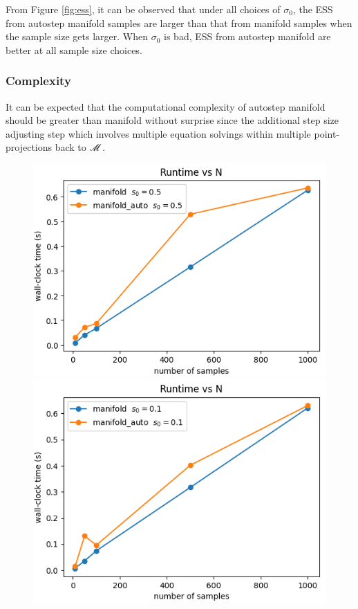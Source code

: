 \documentclass{article}
\begin{document}
From Figure \ref{fig:ess}, it can be observed that under all choices of $\sigma_0$, the ESS from autostep manifold samples are larger than that from manifold samples when the sample size gets larger. When $\sigma_0$ is bad, ESS from autostep manifold are better at all sample size choices.

\subsubsection{Complexity}
It can be expected that the computational complexity of autostep manifold should be greater than manifold without surprise since the additional step size adjusting step which involves multiple equation solvings within multiple point-projections back to $\mathscr{M}$.
\begin{figure}[H]
    \centering
    \begin{adjustbox}{width=\textwidth}
      \includegraphics[height=0.05\textheight]{runtime_bad_s.png}
      \hspace{1em}
      \includegraphics[height=0.05\textheight]{runtime_margin_s.png}

\end{adjustbox}
\end{figure}
\end{document}

